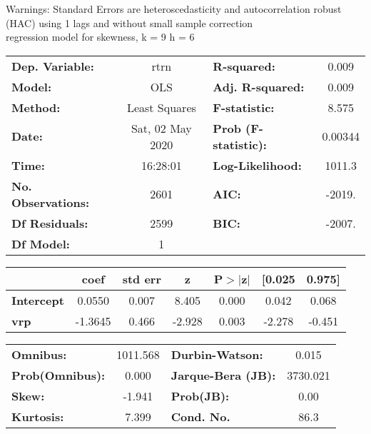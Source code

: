 Warnings: \newline
 [1] Standard Errors are heteroscedasticity and autocorrelation robust (HAC) using 1 lags and without small sample correction\\ 

regression model for skewness, k = 9 h = 6\begin{center}
\begin{tabular}{lclc}
\toprule
\textbf{Dep. Variable:}    &       rtrn       & \textbf{  R-squared:         } &     0.009   \\
\textbf{Model:}            &       OLS        & \textbf{  Adj. R-squared:    } &     0.009   \\
\textbf{Method:}           &  Least Squares   & \textbf{  F-statistic:       } &     8.575   \\
\textbf{Date:}             & Sat, 02 May 2020 & \textbf{  Prob (F-statistic):} &  0.00344    \\
\textbf{Time:}             &     16:28:01     & \textbf{  Log-Likelihood:    } &    1011.3   \\
\textbf{No. Observations:} &        2601      & \textbf{  AIC:               } &    -2019.   \\
\textbf{Df Residuals:}     &        2599      & \textbf{  BIC:               } &    -2007.   \\
\textbf{Df Model:}         &           1      & \textbf{                     } &             \\
\bottomrule
\end{tabular}
\begin{tabular}{lcccccc}
                   & \textbf{coef} & \textbf{std err} & \textbf{z} & \textbf{P$> |$z$|$} & \textbf{[0.025} & \textbf{0.975]}  \\
\midrule
\textbf{Intercept} &       0.0550  &        0.007     &     8.405  &         0.000        &        0.042    &        0.068     \\
\textbf{vrp}       &      -1.3645  &        0.466     &    -2.928  &         0.003        &       -2.278    &       -0.451     \\
\bottomrule
\end{tabular}
\begin{tabular}{lclc}
\textbf{Omnibus:}       & 1011.568 & \textbf{  Durbin-Watson:     } &    0.015  \\
\textbf{Prob(Omnibus):} &   0.000  & \textbf{  Jarque-Bera (JB):  } & 3730.021  \\
\textbf{Skew:}          &  -1.941  & \textbf{  Prob(JB):          } &     0.00  \\
\textbf{Kurtosis:}      &   7.399  & \textbf{  Cond. No.          } &     86.3  \\
\bottomrule
\end{tabular}
\end{center}

